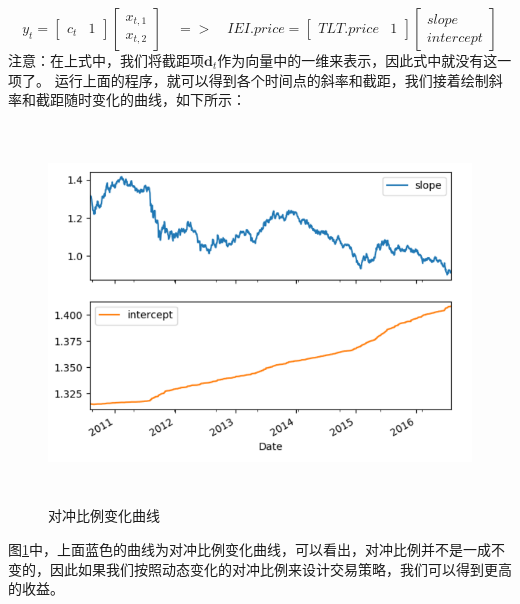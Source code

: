 \begin{equation}
y_{t}=\begin{bmatrix}
c_{t} & 1
\end{bmatrix}\begin{bmatrix}
x_{t,1} \\
x_{t,2}
\end{bmatrix} \quad => \quad IEI.price=\begin{bmatrix}
TLT.price & 1
\end{bmatrix}\begin{bmatrix}
slope \\
intercept
\end{bmatrix}
\label{e000081}
\end{equation}
注意：在上式中，我们将截距项$\boldsymbol{d}_{t}$作为向量中的一维来表示，因此式中就没有这一项了。\newline
运行上面的程序，就可以得到各个时间点的斜率和截距，我们接着绘制斜率和截距随时变化的曲线，如下所示：
\begin{figure}[H]
	\caption{对冲比例变化曲线}
	\label{f000057}
	\centering
	\includegraphics[height=10cm]{images/f000057}
\end{figure}
图\ref{f000057}中，上面蓝色的曲线为对冲比例变化曲线，可以看出，对冲比例并不是一成不变的，因此如果我们按照动态变化的对冲比例来设计交易策略，我们可以得到更高的收益。
